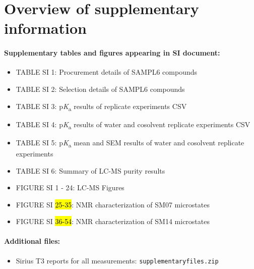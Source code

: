 \documentclass[9pt,lineno]{elife}
\newcommand{\pKa}{p\textit{K}\textsubscript{a}}
\begin{document}
\section{Overview of supplementary information}

\paragraph{Supplementary tables and figures appearing in SI document:}

\begin{itemize}
\item TABLE SI 1: Procurement details of SAMPL6 compounds  

\item TABLE SI 2: Selection details of SAMPL6 compounds  

\item TABLE SI 3: \pKa{} results of replicate experiments CSV

\item TABLE SI 4: \pKa{} results of water and cosolvent replicate experiments CSV

\item TABLE SI 5: \pKa{} mean and SEM results of water and cosolvent replicate experiments

\item TABLE SI 6: Summary of LC-MS purity results

\item FIGURE SI 1 - 24:  LC-MS Figures  

\item FIGURE SI \hl{25-35}: NMR characterization of SM07 microstates  

\item FIGURE SI \hl{36-54}: NMR characterization of SM14 microstates  
\end{itemize}

\paragraph{Additional files:}  
\begin{itemize}
\item Sirius T3 reports for all measurements: {\tt supplementary\textunderscore files.zip}
\end{itemize}
\end{document}
